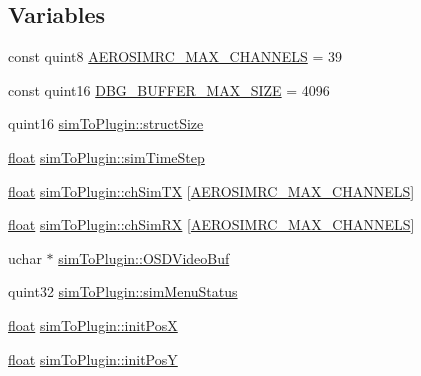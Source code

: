 \subsection*{Variables}
\begin{DoxyCompactItemize}
\item 
const quint8 \hyperlink{group___aero_sim_r_c_ga63f989ac10cdcbfefadc5e65055d3c7d}{A\-E\-R\-O\-S\-I\-M\-R\-C\-\_\-\-M\-A\-X\-\_\-\-C\-H\-A\-N\-N\-E\-L\-S} = 39
\item 
const quint16 \hyperlink{group___aero_sim_r_c_ga4ac56108ad3d382deff679f792d02874}{D\-B\-G\-\_\-\-B\-U\-F\-F\-E\-R\-\_\-\-M\-A\-X\-\_\-\-S\-I\-Z\-E} = 4096
\item 
quint16 \hyperlink{group___aero_sim_r_c_gab277fde5232c4a8c41adcdcc1dc7199f}{sim\-To\-Plugin\-::struct\-Size}
\item 
\hyperlink{_super_l_u_support_8h_a6a1bb6ed41f44b60e7bd83b0e9945aa7}{float} \hyperlink{group___aero_sim_r_c_ga58a610591c7eb9b7e1f32208e4cb343c}{sim\-To\-Plugin\-::sim\-Time\-Step}
\item 
\hyperlink{_super_l_u_support_8h_a6a1bb6ed41f44b60e7bd83b0e9945aa7}{float} \hyperlink{group___aero_sim_r_c_gae5ff2433affe60bce670d0c6bf66ee06}{sim\-To\-Plugin\-::ch\-Sim\-T\-X} \mbox{[}\hyperlink{group___aero_sim_r_c_ga63f989ac10cdcbfefadc5e65055d3c7d}{A\-E\-R\-O\-S\-I\-M\-R\-C\-\_\-\-M\-A\-X\-\_\-\-C\-H\-A\-N\-N\-E\-L\-S}\mbox{]}
\item 
\hyperlink{_super_l_u_support_8h_a6a1bb6ed41f44b60e7bd83b0e9945aa7}{float} \hyperlink{group___aero_sim_r_c_gadefc3aa551adb807da0171a7a92f73ee}{sim\-To\-Plugin\-::ch\-Sim\-R\-X} \mbox{[}\hyperlink{group___aero_sim_r_c_ga63f989ac10cdcbfefadc5e65055d3c7d}{A\-E\-R\-O\-S\-I\-M\-R\-C\-\_\-\-M\-A\-X\-\_\-\-C\-H\-A\-N\-N\-E\-L\-S}\mbox{]}
\item 
uchar $\ast$ \hyperlink{group___aero_sim_r_c_gadc2b5a377a36c5f5d2dfae169880bb1c}{sim\-To\-Plugin\-::\-O\-S\-D\-Video\-Buf}
\item 
quint32 \hyperlink{group___aero_sim_r_c_ga1cc3af651b3f3382357e9a882abc64d4}{sim\-To\-Plugin\-::sim\-Menu\-Status}
\item 
\hyperlink{_super_l_u_support_8h_a6a1bb6ed41f44b60e7bd83b0e9945aa7}{float} \hyperlink{group___aero_sim_r_c_ga23ae6e8ef17ad84cc500793e730df894}{sim\-To\-Plugin\-::init\-Pos\-X}
\item 
\hyperlink{_super_l_u_support_8h_a6a1bb6ed41f44b60e7bd83b0e9945aa7}{float} \hyperlink{group___aero_sim_r_c_gacb4ac6e2ad9d5f215153b9fea05b66bf}{sim\-To\-Plugin\-::init\-Pos\-Y}
\item 

\end{DoxyCompactItemize}
